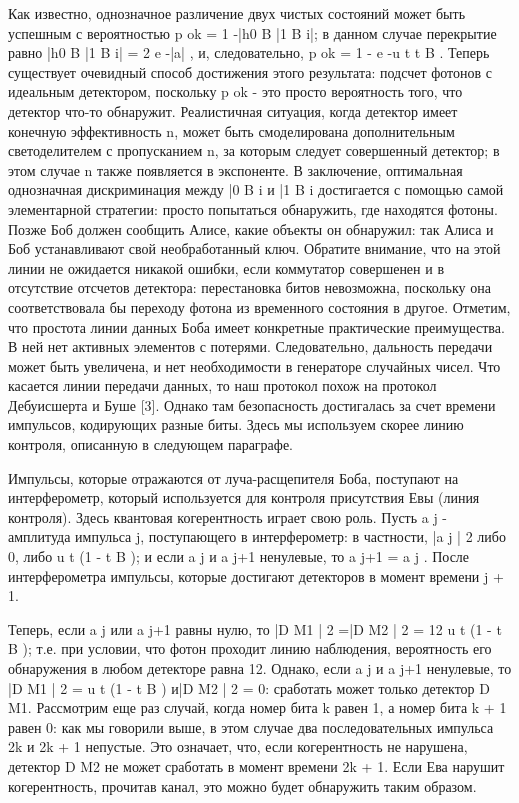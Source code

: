 Как известно, однозначное различение двух чистых состояний может быть успешным с вероятностью p ok = 1 -|h0 B |1 B i|; в данном случае перекрытие равно |h0 B |1 B i| = 2 e -|a| , и, следовательно, p ok = 1 - e -u t t B . Теперь существует очевидный способ достижения этого результата: подсчет фотонов с идеальным детектором, поскольку p ok - это просто вероятность того, что детектор что-то обнаружит. Реалистичная ситуация, когда детектор имеет конечную эффективность n, может быть смоделирована дополнительным светоделителем с пропусканием n, за которым следует совершенный детектор; в этом случае n также появляется в экспоненте. В заключение, оптимальная однозначная дискриминация между |0 B i и |1 B i достигается с помощью самой элементарной стратегии: просто попытаться обнаружить, где находятся фотоны. Позже Боб должен сообщить Алисе, какие объекты он обнаружил: так Алиса и Боб устанавливают свой необработанный ключ. Обратите внимание, что на этой линии не ожидается никакой ошибки, если коммутатор совершенен и в отсутствие отсчетов детектора: перестановка битов невозможна, поскольку она соответствовала бы переходу фотона из временного состояния в другое. Отметим, что простота линии данных Боба имеет конкретные практические преимущества. В ней нет активных элементов с потерями. Следовательно, дальность передачи может быть увеличена, и нет необходимости в генераторе случайных чисел. Что касается линии передачи данных, то наш протокол похож на протокол Дебуисшерта и Буше [3]. Однако там безопасность достигалась за счет времени импульсов, кодирующих разные биты. Здесь мы используем скорее линию контроля, описанную в следующем параграфе.

Импульсы, которые отражаются от луча-расщепителя Боба, поступают на интерферометр, который используется для контроля присутствия Евы (линия контроля). Здесь квантовая когерентность играет свою роль. Пусть a j - амплитуда импульса j, поступающего в интерферометр: в частности, |a j | 2 либо 0, либо u t (1 - t B ); и если a j и a j+1 ненулевые, то a j+1 = a j . После интерферометра импульсы, которые достигают детекторов в момент времени j + 1.


Теперь, если a j или a j+1 равны нулю, то |D M1 | 2 =|D M2 | 2 = 12 u t (1 - t B ); т.е. при условии, что фотон проходит линию наблюдения, вероятность его обнаружения в любом детекторе равна 12. Однако, если a j и a j+1 ненулевые, то |D M1 | 2 = u t (1 - t B ) и|D M2 | 2 = 0: сработать может только детектор D M1. Рассмотрим еще раз случай, когда номер бита k равен 1, а номер бита k + 1 равен 0: как мы говорили выше, в этом случае два последовательных импульса 2k и 2k + 1 непустые. Это означает, что, если когерентность не нарушена, детектор D M2 не может сработать в момент времени 2k + 1. Если Ева нарушит когерентность, прочитав канал, это можно будет обнаружить таким образом.

